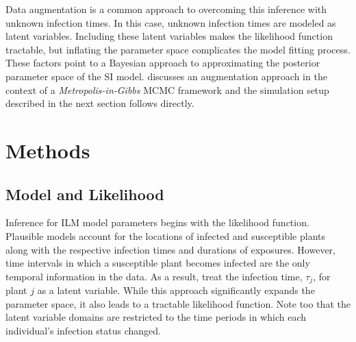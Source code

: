 \documentclass{uwstat572}
\begin{document}
Data augmentation is a common approach to overcoming this inference with unknown infection times. 
In this case, unknown infection times are modeled as latent variables. 
Including these latent variables makes the likelihood function tractable, but inflating the parameter space complicates the model fitting process. 
These factors point to a Bayesian approach to approximating the posterior parameter space of the SI model. 
\citet{Jewell} discusses an augmentation approach in the context of a \textit{Metropolis-in-Gibbs} MCMC framework and the simulation setup described in the next section follows directly. 

\section{Methods}
\subsection{Model and Likelihood}

Inference for ILM model parameters begins with the likelihood function. 
Plausible models account for the locations of infected and susceptible plants along with the respective infection times and durations of exposures. 
However, time intervals in which a susceptible plant becomes infected are the only temporal information in the data. 
As a result, treat the infection time, $\tau_j$, for plant $j$ as a latent variable. 
While this approach significantly expands the parameter space, it also leads to a tractable likelihood function. 
Note too that the latent variable domains are restricted to the time periods in which each individual's infection status changed. 
\end{document}
